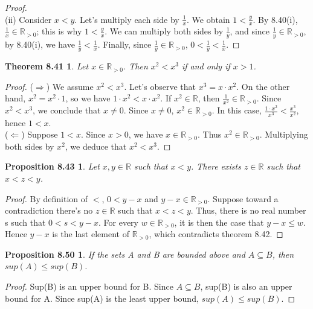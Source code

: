 \documentclass[12pt]{amsart}
\newcommand{\R}{\mathbb{R}}
\begin{document}
\begin{proof}
	\\\indent(ii) Consider $x < y$. Let's multiply each side by $\frac{1}{x}$. We obtain $1 < \frac{y}{x}$. By 8.40(i), $\frac{1}{x} \in \R_{>0}$; this is why $1 < \frac{y}{x}$. We can multiply both sides by $\frac{1}{y}$, and since $\frac{1}{y} \in \R_{>0}$, by 8.40(i), we have $\frac{1}{y} < \frac{1}{x}$. Finally, since $\frac{1}{y} \in \R_{>0}$, $0 < \frac{1}{y} < \frac{1}{x}$.
\end{proof}

\newtheorem*{thm8.41}{Theorem 8.41}
\begin{thm8.41}
	Let $x \in \R_{>0}$. Then $x^2 < x^3$ if and only if $x > 1$.
\end{thm8.41}

\begin{proof}
	($\Rightarrow$) We assume $x^2 < x^3$. Let's observe that $x^3 = x \cdot x^2$. On the other hand, $x^2 = x^2 \cdot 1$, so we have $1 \cdot x^2 < x \cdot x^2$. If $x^2 \in \R$, then $\frac{1}{x^2} \in \R_{>0}$. Since $x^2 < x^3$, we conclude that $x \neq 0$. Since $x \neq 0$, $x^2 \in \R_{>0}$. In this case, $\frac{1 \cdot x^2}{x^3} < \frac{x^3}{x^2}$, hence $1 < x$.
	\\($\Leftarrow$) Suppose $1 < x$. Since $x > 0$, we have $x \in \R_{>0}$. Thus $x^2 \in \R_{>0}$. Multiplying both sides by $x^2$, we deduce that $x^2 < x^3$.
\end{proof}

\newtheorem*{prop8.43}{Proposition 8.43}
\begin{prop8.43}
	Let $x,y \in \R$ such that $x < y$. There exists $z \in \R$ such that $x < z < y$.
\end{prop8.43}

\begin{proof}
	By definition of $<$, $0 < y - x$ and $y - x \in \R_{>0}$. Suppose toward a contradiction there's no $z \in \R$ such that $x < z < y$. Thus, there is no real number s such that $0 < s < y - x$. For every $w \in \R_{>0}$, it is then the case that $y - x \leq w$. Hence $y - x$ is the last element of $\R_{>0}$, which contradicts theorem 8.42.
\end{proof}

\newtheorem*{prop8.50}{Proposition 8.50}
\begin{prop8.50}
	If the sets A and B are bounded above and $A \subseteq B$, then $sup(A) \leq sup(B)$.
\end{prop8.50}

\begin{proof}
	Sup(B) is an upper bound for B. Since $A \subseteq B$, sup(B) is also an upper bound for A. Since sup(A) is the least upper bound, $sup(A) \leq sup(B)$.
\end{proof}
\end{document}
